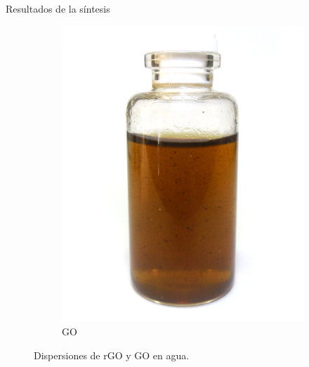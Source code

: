 \documentclass{beamer}
\begin{document}
\begin{frame}{Resultados de la síntesis}
\begin{figure}[h]
{\begin{subfigure}{0.42\textwidth}
					\includegraphics[width=\textwidth]{GO_pic.png}
					\caption{GO}
					\label{fig:GO}
				\end{subfigure}
			}
			\caption[Dispersiones de rGO y GO en agua]{Dispersiones de rGO y GO en agua.}
			\label{fig:RGOyGO}
		\end{figure}
	\end{frame}
	
\end{document}
